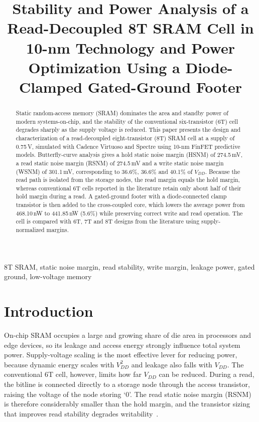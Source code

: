 \documentclass[conference]{IEEEtran}
\begin{document}
\title{Stability and Power Analysis of a Read-Decoupled 8T SRAM Cell in 10-nm Technology and Power Optimization Using a Diode-Clamped Gated-Ground Footer}

\author{
}

\maketitle

\begin{abstract}
Static random-access memory (SRAM) dominates the area and standby power of modern systems-on-chip, and the stability of the conventional six-transistor (6T) cell degrades sharply as the supply voltage is reduced. This paper presents the design and characterization of a read-decoupled eight-transistor (8T) SRAM cell at a supply of 0.75\,V, simulated with Cadence Virtuoso and Spectre using 10-nm FinFET predictive models. Butterfly-curve analysis gives a hold static noise margin (HSNM) of 274.5\,mV, a read static noise margin (RSNM) of 274.5\,mV and a write static noise margin (WSNM) of 301.1\,mV, corresponding to 36.6\%, 36.6\% and 40.1\% of $V_{DD}$. Because the read path is isolated from the storage nodes, the read margin equals the hold margin, whereas conventional 6T cells reported in the literature retain only about half of their hold margin during a read. A gated-ground footer with a diode-connected clamp transistor is then added to the cross-coupled core, which lowers the average power from 468.10\,nW to 441.85\,nW (5.6\%) while preserving correct write and read operation. The cell is compared with 6T, 7T and 8T designs from the literature using supply-normalized margins.
\end{abstract}

\begin{IEEEkeywords}
8T SRAM, static noise margin, read stability, write margin, leakage power, gated ground, low-voltage memory
\end{IEEEkeywords}

\section{Introduction}
On-chip SRAM occupies a large and growing share of die area in processors and edge devices, so its leakage and access energy strongly influence total system power. Supply-voltage scaling is the most effective lever for reducing power, because dynamic energy scales with $V_{DD}^2$ and leakage also falls with $V_{DD}$. The conventional 6T cell, however, limits how far $V_{DD}$ can be reduced. During a read, the bitline is connected directly to a storage node through the access transistor, raising the voltage of the node storing `0'. The read static noise margin (RSNM) is therefore considerably smaller than the hold margin, and the transistor sizing that improves read stability degrades writability~\cite{seevinck1987snm}.
\end{document}
